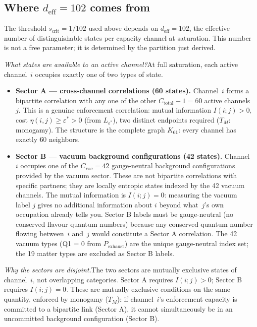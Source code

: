 \documentclass[11pt]{article}
\newenvironment{varlist}{\begin{itemize}[nosep,leftmargin=2em]}{\end{itemize}}
\begin{document}
\subsection{Where \texorpdfstring{$d_{\mathrm{eff}} = 102$}{deff = 102} comes from}
\label{sec:deff}

The threshold $s_{\mathrm{crit}} = 1/102$ used above depends on $d_{\mathrm{eff}} = 102$, the effective number of distinguishable states per capacity channel at saturation.  This number is not a free parameter; it is determined by the partition just derived.

\textit{What states are available to an active channel?}\quad  At full saturation, each active channel~$i$ occupies exactly one of two types of state.

\begin{varlist}
\item \textbf{Sector A --- cross-channel correlations (60 states).}  Channel~$i$ forms a bipartite correlation with any one of the other $C_{\mathrm{total}} - 1 = 60$ active channels~$j$.  This is a genuine enforcement correlation: mutual information $I(i;j) > 0$, cost $\eta(i,j) \ge \varepsilon^* > 0$ (from $L_{\varepsilon^*}$), two distinct endpoints required ($T_M$: monogamy).  The structure is the complete graph $K_{61}$: every channel has exactly 60 neighbors.
\item \textbf{Sector B --- vacuum background configurations (42 states).}  Channel~$i$ occupies one of the $C_{\mathrm{vac}} = 42$ gauge-neutral background configurations provided by the vacuum sector.  These are not bipartite correlations with specific partners; they are locally entropic states indexed by the 42 vacuum channels.  The mutual information is $I(i;j) = 0$: measuring the vacuum label $j$ gives no additional information about $i$ beyond what~$j$'s own occupation already tells you.  Sector B labels must be gauge-neutral (no conserved flavour quantum numbers) because any conserved quantum number flowing between~$i$ and~$j$ would constitute a Sector A correlation.  The 42 vacuum types (Q1 = 0 from $P_{\mathrm{exhaust}}$) are the unique gauge-neutral index set; the 19 matter types are excluded as Sector B labels.
\end{varlist}

\textit{Why the sectors are disjoint.}\quad The two sectors are mutually exclusive states of channel~$i$, not overlapping categories.  Sector A requires $I(i;j) > 0$; Sector B requires $I(i;j) = 0$.  These are mutually exclusive conditions on the same quantity, enforced by monogamy ($T_M$): if channel~$i$'s enforcement capacity is committed to a bipartite link (Sector A), it cannot simultaneously be in an uncommitted background configuration (Sector B).
\end{document}
